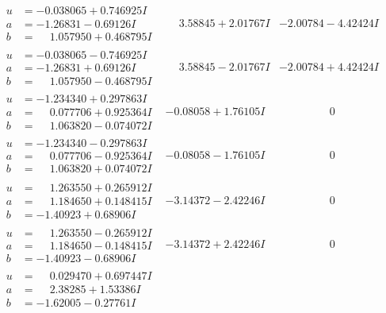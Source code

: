 \documentclass[1p]{elsarticle_modified}
\theoremstyle{definition}
\begin{document}
$$\begin{array}{c|c|c}
\begin{aligned}
u &= -0.038065 + 0.746925 I \\
a &= -1.26831 - 0.69126 I \\
b &= \phantom{-}1.057950 + 0.468795 I\end{aligned}
 & \phantom{-}3.58845 + 2.01767 I & -2.00784 - 4.42424 I \\ \hline\begin{aligned}
u &= -0.038065 - 0.746925 I \\
a &= -1.26831 + 0.69126 I \\
b &= \phantom{-}1.057950 - 0.468795 I\end{aligned}
 & \phantom{-}3.58845 - 2.01767 I & -2.00784 + 4.42424 I \\ \hline\begin{aligned}
u &= -1.234340 + 0.297863 I \\
a &= \phantom{-}0.077706 + 0.925364 I \\
b &= \phantom{-}1.063820 - 0.074072 I\end{aligned}
 & -0.08058 + 1.76105 I & \phantom{-0.000000 } 0 \\ \hline\begin{aligned}
u &= -1.234340 - 0.297863 I \\
a &= \phantom{-}0.077706 - 0.925364 I \\
b &= \phantom{-}1.063820 + 0.074072 I\end{aligned}
 & -0.08058 - 1.76105 I & \phantom{-0.000000 } 0 \\ \hline\begin{aligned}
u &= \phantom{-}1.263550 + 0.265912 I \\
a &= \phantom{-}1.184650 + 0.148415 I \\
b &= -1.40923 + 0.68906 I\end{aligned}
 & -3.14372 - 2.42246 I & \phantom{-0.000000 } 0 \\ \hline\begin{aligned}
u &= \phantom{-}1.263550 - 0.265912 I \\
a &= \phantom{-}1.184650 - 0.148415 I \\
b &= -1.40923 - 0.68906 I\end{aligned}
 & -3.14372 + 2.42246 I & \phantom{-0.000000 } 0 \\ \hline\begin{aligned}
u &= \phantom{-}0.029470 + 0.697447 I \\
a &= \phantom{-}2.38285 + 1.53386 I \\
b &= -1.62005 - 0.27761 I\end{aligned}

\end{array}$$
\end{document}
